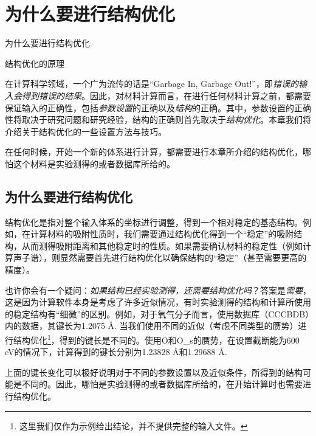 \section{为什么要进行结构优化}\label{sec:为什么要进行结构优化}

\begin{Abstract}
    \item 为什么要进行结构优化
    \item 结构优化的原理
\end{Abstract}

在计算科学领域，一个广为流传的话是“Garbage In, Garbage Out!”，即\emph{错误的输入会得到错误的结果}。因此，对材料计算而言，在进行任何材料计算之前，都需要保证输入的正确性，包括\emph{参数设置}的正确以及\emph{结构}的正确。其中，参数设置的正确性将取决于研究问题和研究经验，结构的正确则首先取决于\emph{结构优化}。本章我们将介绍关于结构优化的一些设置方法与技巧。

\begin{attention}
    在任何时候，开始一个新的体系进行计算，都需要进行本章所介绍的结构优化，哪怕这个材料是实验测得的或者数据库所给的。
\end{attention}

\subsection{为什么要进行结构优化}\label{subsec:为什么要进行结构优化-为什么要进行结构优化}

结构优化是指对整个输入体系的坐标进行调整，得到一个相对稳定的基态结构。例如，在计算材料的吸附性质时，我们需要通过结构优化得到一个“稳定”的吸附结构，从而测得吸附距离和其他稳定时的性质。如果需要确认材料的稳定性（例如计算声子谱），则显然需要首先进行结构优化以确保结构的“稳定”（甚至需要更高的精度）。

也许你会有一个疑问：\emph{如果结构已经实验测得，还需要结构优化吗}？答案是\emph{需要}，这是因为计算软件本身是考虑了许多近似情况，有时实验测得的结构和计算所使用的稳定结构有“细微”的区别。例如，对于氧气分子而言，使用数据库（CCCBDB）内的数据，其键长为1.2075 Å. 当我们使用不同的近似（考虑不同类型的赝势）进行结构优化\footnote{这里我们仅作为示例给出结论，并不提供完整的输入文件。}，得到的键长是不同的。使用O和O\_s的赝势，在设置截断能为600 eV的情况下，计算得到的键长分别为1.23828 Å和1.29688 Å.

上面的键长变化可以极好说明对于不同的参数设置以及近似条件，所得到的结构可能是不同的。因此，哪怕是实验测得的或者数据库所给的，在开始计算时也需要进行结构优化。

